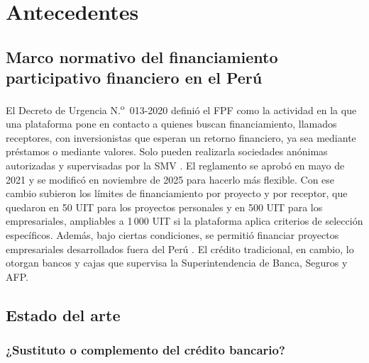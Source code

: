 \section{Antecedentes}

\subsection{Marco normativo del financiamiento participativo financiero en el Perú}

El Decreto de Urgencia N.\textsuperscript{o}~013-2020 definió el FPF como la actividad en la que una plataforma pone en contacto a quienes buscan financiamiento, llamados receptores, con inversionistas que esperan un retorno financiero, ya sea mediante préstamos o mediante valores. Solo pueden realizarla sociedades anónimas autorizadas y supervisadas por la SMV \parencite{du0132020}. El reglamento se aprobó en mayo de 2021 \parencite{smv0452021} y se modificó en noviembre de 2025 para hacerlo más flexible. Con ese cambio subieron los límites de financiamiento por proyecto y por receptor, que quedaron en 50 UIT para los proyectos personales y en 500 UIT para los empresariales, ampliables a 1\,000 UIT si la plataforma aplica criterios de selección específicos. Además, bajo ciertas condiciones, se permitió financiar proyectos empresariales desarrollados fuera del Perú \parencite{smv0192025}. El crédito tradicional, en cambio, lo otorgan bancos y cajas que supervisa la Superintendencia de Banca, Seguros y AFP.

\subsection{Estado del arte}

\subsubsection{¿Sustituto o complemento del crédito bancario?}

